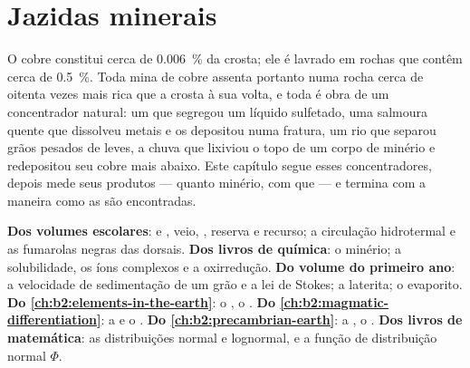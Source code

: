 \chapter{Jazidas minerais}\label{ch:b2:ore-deposits}

O cobre constitui cerca de \qty{0.006}{\percent} da crosta; ele é lavrado em rochas que contêm cerca de
\qty{0.5}{\percent}. Toda mina de cobre assenta portanto numa rocha cerca de oitenta vezes mais rica que a
crosta à sua volta, e toda  é obra de um concentrador natural: um  que
segregou um líquido sulfetado, uma salmoura quente que dissolveu metais e os depositou numa fratura, um
rio que separou grãos pesados de leves, a chuva que lixiviou o topo de um corpo de minério e
redepositou seu cobre mais abaixo. Este capítulo segue esses concentradores, depois mede seus
produtos --- quanto minério, com que  --- e termina com a maneira como as  são encontradas.

\begin{recall}
\textbf{Dos volumes escolares}:  e , veio, , reserva e
recurso; a circulação hidrotermal e as fumarolas negras das dorsais. \textbf{Dos livros de
química}: o minério; a solubilidade, os íons complexos e a oxirredução. \textbf{Do volume do primeiro ano}: a velocidade
de sedimentação de um grão e a lei de Stokes; a laterita; o evaporito. \textbf{Do
\cref{ch:b2:elements-in-the-earth}}: o , o . \textbf{Do \cref{ch:b2:magmatic-differentiation}}: a  e o
. \textbf{Do \cref{ch:b2:precambrian-earth}}: a , o .
\textbf{Dos livros de matemática}: as distribuições normal e lognormal, e a função de
distribuição normal $\Phi$.
\end{recall}

